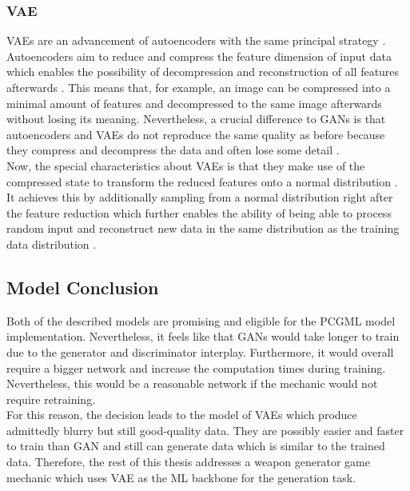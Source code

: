 \documentclass[MGS,Master,english]{twbook}%
\begin{document}
\subsubsection{\acl{VAE}}
\acp{VAE} are an advancement of autoencoders with the same principal strategy \cite{ml::vae::tutorial}. Autoencoders aim to reduce and compress the feature dimension of input data which enables the possibility of decompression and reconstruction of all features afterwards \cite{ml::book::nnProgrammingTF}. This means that, for example, an image can be compressed into a minimal amount of features and decompressed to the same image afterwards without losing its meaning. Nevertheless, a crucial difference to \acp{GAN} is that autoencoders and \acp{VAE} do not reproduce the same quality as before because they compress and decompress the data and often lose some detail \cite{ml::book::nnProgrammingTF}. \\
Now, the special characteristics about \acp{VAE} is that they make use of the compressed state to transform the reduced features onto a normal distribution \cite{ml::vae::tutorial}. It achieves this by additionally sampling from a normal distribution right after the feature reduction which further enables the ability of being able to process random input and reconstruct new data in the same distribution as the training data distribution \cite{ml::vae::tutorial}.

\subsection{Model Conclusion}
Both of the described models are promising and eligible for the PCGML model implementation. Nevertheless, it feels like that \acp{GAN} would take longer to train due to the generator and discriminator interplay. Furthermore, it would overall require a bigger network and increase the computation times during training. Nevertheless, this would be a reasonable network if the mechanic would not require retraining.\\
For this reason, the decision leads to the model of \acp{VAE} which produce admittedly blurry but still good-quality data. They are possibly easier and faster to train than \ac{GAN} and still can generate data which is similar to the trained data. Therefore, the rest of this thesis addresses a weapon generator game mechanic which uses \ac{VAE} as the ML backbone for the generation task.
\end{document}
